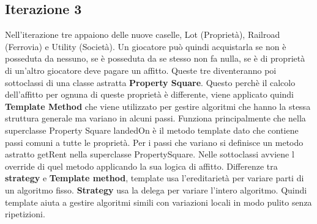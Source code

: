 \documentclass{article}
\numberwithin{equation}{subsection}
\begin{document}
\subsection{Iterazione 3}
Nell'iterazione tre appaiono delle nuove caselle, Lot (Proprietà), Railroad (Ferrovia) e Utility (Società). Un giocatore può quindi acquistarla se non è posseduta da nessuno, se è posseduta da se stesso non fa nulla, se è di proprietà di un'altro giocatore deve pagare un affitto. Queste tre diventeranno poi sottoclassi di una classe astratta \textbf{Property Square}. Questo perchè il calcolo dell'affitto per ognuna di queste proprietà è differente, viene applicato quindi \textbf{Template Method} che viene utilizzato per gestire algoritmi che hanno la stessa struttura generale ma variano in alcuni passi. Funziona principalmente che nella superclasse Property Square landedOn è il metodo template dato che contiene passi comuni a tutte le proprietà. Per i passi che variano si definisce un metodo astratto getRent nella superclasse PropertySquare. Nelle sottoclassi avviene l override di quel metodo applicando la sua logica di affitto. Differenze tra \textbf{strategy} e \textbf{Template method}, template usa l'ereditarietà per variare parti di un algoritmo fisso. \textbf{Strategy} usa la delega per variare l'intero algoritmo. Quindi template aiuta a gestire algoritmi simili con variazioni locali in modo pulito senza ripetizioni.
\clearpage
\end{document}

